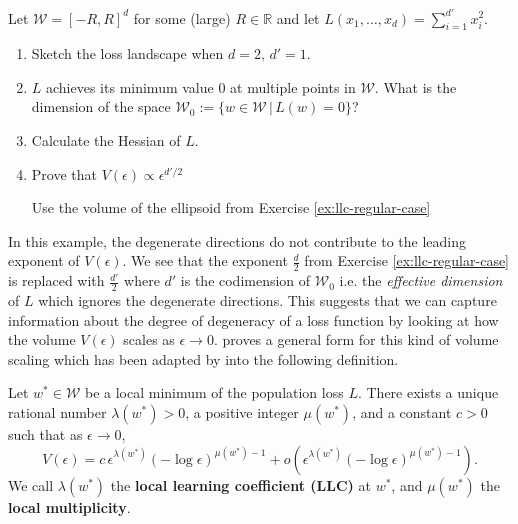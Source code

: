 \documentclass[11pt]{article}
\newcommand{\R}{\mathbb{R}}
\newcommand{\W}{\mathcal{W}}
\begin{document}
\begin{exercise}
    \label{ex:quad-valley-scaling}
    Let $\W = [-R,R]^d$ for some (large) $R\in\R$ and let $L(x_1,\dots,x_d) = \sum\limits_{i=1}^{d'}x_i^2$.
    \begin{enumerate}
        \item Sketch the loss landscape when $d=2, \,d'=1$.
        \item $L$ achieves its minimum value $0$ at multiple points in $\W$. What is the dimension of the space $\W_0 :=  \{w\in\W \, | \,L(w)=0\}$? 
        \item Calculate the Hessian of $L$.
        \item Prove that $V(\epsilon) \propto \epsilon^{d'/2}$
        
        \begin{hint}
Use the volume of the ellipsoid from Exercise \ref{ex:llc-regular-case}
        \end{hint}
    \end{enumerate}
\end{exercise}

In this example, the degenerate directions do not contribute to the leading exponent of $V(\epsilon)$. We see that the exponent $\frac{d}{2}$ from Exercise \ref{ex:llc-regular-case} is replaced with $\frac{d'}{2}$ where $d'$ is the codimension of $\W_0$ i.e. the \textit{effective dimension} of $L$ which ignores the degenerate directions. This suggests that we can capture information about the degree of degeneracy of a loss function by looking at how the volume $V(\epsilon)$ scales as $\epsilon \to 0$. \cite{Watanabe2009} proves a general form for this kind of volume scaling which has been adapted by \cite{Lau+2025} into the following definition.

\begin{definition}
\label{def:llc}
    Let $w^* \in \W$ be a local minimum of the population loss $L$. There exists a unique rational number $\lambda(w^*) > 0$, a positive integer $\mu(w^*)$, and a constant $c > 0$ such that as $\epsilon \to 0$,
    \begin{equation}
    \label{eq:llc-volume}
        V(\epsilon) = c \, \epsilon^{\lambda(w^*)} (-\log \epsilon)^{\mu(w^*)-1} + o\!\left(\epsilon^{\lambda(w^*)} (-\log \epsilon)^{\mu(w^*)-1}\right).
    \end{equation}
    We call $\lambda(w^*)$ the \textbf{local learning coefficient (LLC)} at $w^*$, and $\mu(w^*)$ the \textbf{local multiplicity}.
\end{definition}
\end{document}
